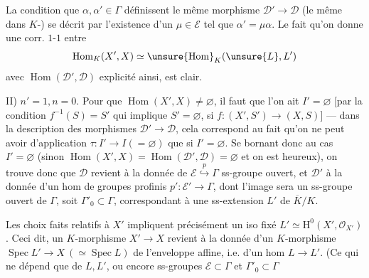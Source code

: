 La condition que $\alpha,\alpha'\in\Gamma$ définissent le même morphisme $\mathcal D'\longrightarrow\mathcal D$ (le même dans $K$-) se décrit par l'existence d'un $\mu\in\mathcal E$  tel que $\alpha'=\mu\alpha$.
Le fait qu'on donne une corr. $1$-$1$ entre
\[
\operatorname{Hom}_{K}(X',X)\simeq\unsure{\operatorname{Hom}}_{K}(\unsure{L},L')
\]
avec $\operatorname{Hom}(\mathcal D',\mathcal D)$ explicité ainsi, est clair.

II) $n'=1,n=0$.
 Pour que $\operatorname{Hom}(X',X)\ne\varnothing$, il faut que l'on ait $I'=\varnothing$
[par la condition $f^{-1}(S)=S'$ qui implique $S'=\varnothing$, si $f:(X',S')\longrightarrow(X,S)$]
---  dans la description des morphismes $\mathcal D'\longrightarrow\mathcal D$, cela correspond au fait qu'on ne peut avoir d'application $\tau:I'\longrightarrow I(=\varnothing)$ que si $I'=\varnothing$.
Se bornant donc au cas $I'=\varnothing$ (sinon $\operatorname{Hom}(X',X)=\operatorname{Hom}(\mathcal D',\mathcal D)=\varnothing$ et on est heureux), on trouve donc que $\mathcal D$ revient à la donnée de $\mathcal E\overset{p}{\hookrightarrow}\Gamma$ ss-groupe ouvert, et $\mathcal D'$ à la donnée d'un hom de groupes profinis $p':\mathcal E'\longrightarrow\Gamma$, dont l'image sera un ss-groupe ouvert de $\Gamma$, soit $\Gamma'_0\subset\Gamma$, correspondant à une ss-extension  $L'$ de $\overline K/K$.

Les choix faits relatifs à $X'$ impliquent précisément un iso fixé $L'\simeq\mathrm H^0(X',\mathcal O_{X'})$.
Ceci dit, un $K$-morphisme  $X'\longrightarrow X$ revient  à la donnée d'un $K$-morphisme $\operatorname{Spec}L'\longrightarrow X\ (\simeq\operatorname{Spec}L)$ de l'enveloppe affine, i.e. d'un hom $L\longrightarrow L'$.
(Ce qui ne dépend que de $L,L'$, ou encore   ss-groupes $\mathcal E\subset\Gamma$ et $\Gamma'_0\subset\Gamma$

